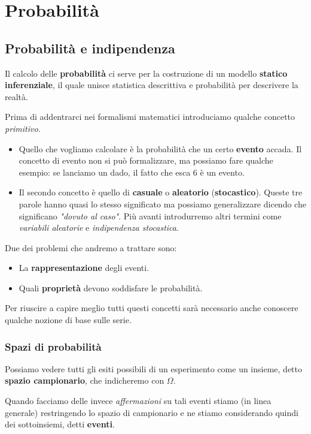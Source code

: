\part{Probabilità}

\chapter{Probabilità e indipendenza}
Il calcolo delle \textbf{probabilità} ci serve per la costruzione di un modello
\textbf{statico inferenziale}, il quale unisce statistica descrittiva e probabilità per descrivere
la realtà.

Prima di addentrarci nei formalismi matematici introduciamo qualche concetto \emph{primitivo}.
\begin{itemize}
	\item Quello che vogliamo calcolare è la probabilità che un certo \textbf{evento} accada. Il
	      concetto
	      di evento non si può formalizzare, ma possiamo fare qualche esempio: se lanciamo un dado,
	      il fatto che esca 6 è un evento.
	\item Il secondo concetto è quello di \textbf{casuale} o \textbf{aleatorio}
	      (\textbf{stocastico}). Queste tre parole hanno quasi lo stesso significato ma possiamo
	      generalizzare dicendo che significano \emph{"dovuto al caso"}. Più avanti introdurremo
	      altri termini come \emph{variabili aleatorie} e \emph{indipendenza stocastica}.
\end{itemize}
Due dei problemi che andremo a trattare sono:
\begin{itemize}
	\item La \textbf{rappresentazione} degli eventi.
	\item Quali \textbf{proprietà} devono soddisfare le probabilità.
\end{itemize}
Per riuscire a capire meglio tutti questi concetti sarà necessario anche conoscere qualche nozione
di base sulle serie.

\section{Spazi di probabilità}
Possiamo vedere tutti gli esiti possibili di un esperimento come un insieme, detto
\textbf{spazio campionario}, che indicheremo con $\Omega$.

Quando facciamo delle invece \emph{affermazioni} su tali eventi stiamo (in linea generale)
restringendo lo spazio di campionario e ne stiamo considerando quindi dei sottoinsiemi, detti
\textbf{eventi}.

